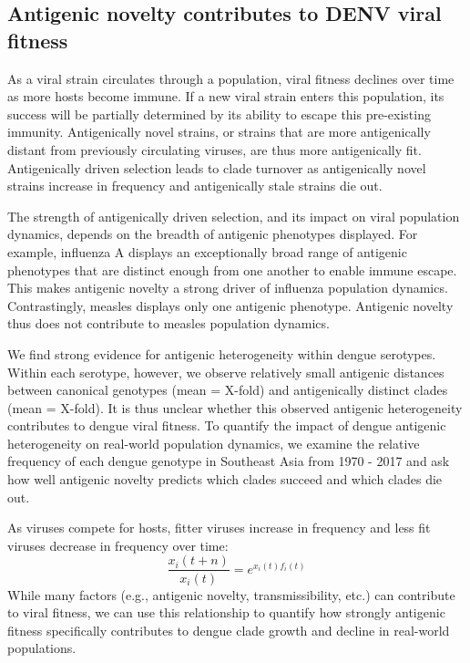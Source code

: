 \documentclass[11pt,oneside,letterpaper]{article}
\begin{document}
\subsection*{Antigenic novelty contributes to DENV viral fitness}

As a viral strain circulates through a population, viral fitness declines over time as more hosts become immune.
If a new viral strain enters this population, its success will be partially determined by its ability to escape this pre-existing immunity.
Antigenically novel strains, or strains that are more antigenically distant from previously circulating viruses, are thus more antigenically fit.
Antigenically driven selection leads to clade turnover as antigenically novel strains increase in frequency and antigenically stale strains die out.

The strength of antigenically driven selection, and its impact on viral population dynamics, depends on the breadth of antigenic phenotypes displayed.
For example, influenza A displays an exceptionally broad range of antigenic phenotypes that are distinct enough from one another to enable immune escape.
This makes antigenic novelty a strong driver of influenza population dynamics.
Contrastingly, measles displays only one antigenic phenotype.
Antigenic novelty thus does not contribute to measles population dynamics.

We find strong evidence for antigenic heterogeneity within dengue serotypes.
Within each serotype, however, we observe relatively small antigenic distances between canonical genotypes (mean = X-fold) and antigenically distinct clades (mean = X-fold).
It is thus unclear whether this observed antigenic heterogeneity contributes to dengue viral fitness.
To quantify the impact of dengue antigenic heterogeneity on real-world population dynamics, we examine the relative frequency of each dengue genotype in Southeast Asia from 1970 - 2017 and ask how well antigenic novelty predicts which clades succeed and which clades die out.


As viruses compete for hosts, fitter viruses increase in frequency and less fit viruses decrease in frequency over time:
$$\frac{x_i(t+n)}{x_i(t)} = e^{x_i(t) f_i(t)}$$
While many factors (e.g., antigenic novelty, transmissibility, etc.) can contribute to viral fitness, we can use this relationship to quantify how strongly antigenic fitness specifically contributes to dengue clade growth and decline in real-world populations.
\end{document}
